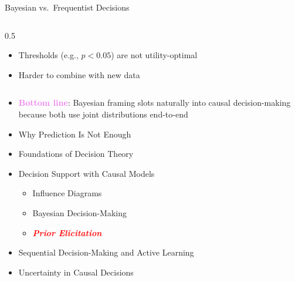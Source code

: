 \documentclass[
  10pt,
  ignorenonframetext,
]{beamer}
\providecommand{\tightlist}{%
  \setlength{\itemsep}{0pt}\setlength{\parskip}{0pt}}
\begin{document}
\begin{frame}{Bayesian vs.~Frequentist Decisions}
\begin{columns}[T]
\begin{column}{0.5\textwidth}
\begin{itemize}
  \begin{itemize}
  \tightlist
  \item
    Thresholds (e.g., \(p < 0.05\)) are not utility-optimal
  \item
    Harder to combine with new data
  \end{itemize}
\end{itemize}
\end{column}
\end{columns}

\begin{itemize}
\tightlist
\item
  \textbf{\textcolor{violet}{Bottom line}}: Bayesian framing slots
  naturally into causal decision-making because both use joint
  distributions end-to-end
\end{itemize}
\end{frame}

\begin{frame}{}
\label{section-11}
\begin{itemize}
\tightlist
\item
  Why Prediction Is Not Enough
\item
  Foundations of Decision Theory
\item
  Decision Support with Causal Models

  \begin{itemize}
  \tightlist
  \item
    Influence Diagrams
  \item
    Bayesian Decision-Making
  \item
    \emph{\textbf{\textcolor{red}{Prior Elicitation}}}
  \end{itemize}
\item
  Sequential Decision-Making and Active Learning
\item
  Uncertainty in Causal Decisions
\end{itemize}
\end{frame}
\end{document}
